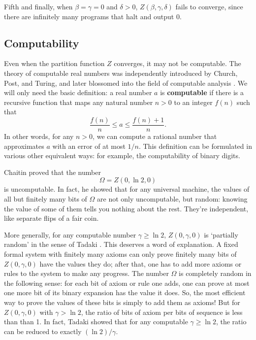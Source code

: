 \documentclass{article}
\begin{document}
Fifth and finally, when $\beta = \gamma = 0$ and $\delta > 0$, 
$Z(\beta,\gamma,\delta)$ fails to converge, since there are infinitely many 
programs that halt and output 0.

\subsection{Computability} \label{computability}

Even when the partition function $Z$ converges, it may not be 
computable.  The theory of computable real numbers was independently
introduced by Church, Post, and Turing, and later blossomed into 
the field of computable analysis \cite{PourElRichards}.
We will only need the basic definition: a real number $a$ is {\bf 
computable} if there is a recursive function that maps any
natural number $n > 0$ to an integer $f(n)$ such that
\[              \frac{f(n)}{n} \le a \le \frac{f(n)+1}{n}  .\]
In other words, for any $n > 0$, we can compute a rational number
that approximates $a$ with an error of at most $1/n$.  This definition
can be formulated in various other equivalent ways: for example,
the computability of binary digits.

Chaitin \cite{Chaitin1975} proved that the number
\[     \Omega = Z(0,\ln 2, 0)  \]
is uncomputable.  In fact, he showed that for any universal 
machine, the values of all but finitely many bits of $\Omega$ are not 
only uncomputable, but random: knowing the value of some of them 
tells you nothing about the rest.  They're independent, like separate 
flips of a fair coin.

More generally, for any computable number $\gamma \ge \ln 2$, 
$Z(0,\gamma,0)$ is `partially random' in the sense of 
Tadaki \cite{CST2004,Tadaki2002}.  
This deserves a word of explanation.  A fixed formal system with 
finitely many axioms can only prove finitely many bits of 
$Z(0,\gamma,0)$ have the values they do; after that, 
one has to add more axioms or rules to the system to make any progress.  
The number $\Omega$ is completely random in the following sense:
for each bit of axiom or rule one adds, one can prove at most one 
more bit of its binary expansion has the value it does.  So, the most 
efficient way to prove the values of these bits is simply to add 
them as axioms!  But for $Z(0,\gamma,0)$ with $\gamma > \ln 2$,
the ratio of bits of axiom per bits of sequence is less than than 1.
In fact, Tadaki showed that for any computable $\gamma \ge \ln 2$, 
the ratio can be reduced to exactly $(\ln 2)/\gamma$.
\end{document}
